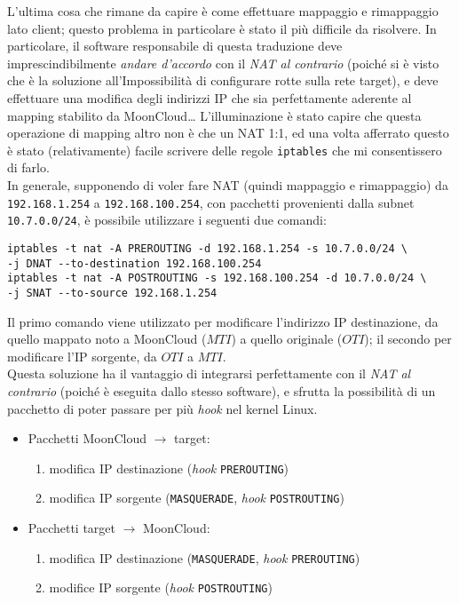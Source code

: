 L'ultima cosa che rimane da capire è come effettuare mappaggio e rimappaggio lato client;
questo problema in particolare è stato il più difficile da risolvere.
In particolare, il software responsabile di questa traduzione deve imprescindibilmente
\textit{andare d'accordo} con il \textit{NAT al contrario} (poiché si è visto che
è la soluzione all'Impossibilità di configurare rotte sulla rete target), e deve effettuare
una modifica degli indirizzi IP che sia perfettamente aderente al mapping stabilito
da MoonCloud\ldots
L'illuminazione è stato capire che questa operazione di mapping altro non è che un
NAT 1:1, ed una volta afferrato questo è stato (relativamente) facile scrivere delle
regole \texttt{iptables} che mi consentissero di farlo.\\
In generale, supponendo di voler fare NAT (quindi mappaggio e rimappaggio) da
\texttt{192.168.1.254} a \texttt{192.168.100.254},
con pacchetti provenienti dalla subnet \texttt{10.7.0.0/24}, è possibile
utilizzare i seguenti
due comandi:
\begin{verbatim}
iptables -t nat -A PREROUTING -d 192.168.1.254 -s 10.7.0.0/24 \
-j DNAT --to-destination 192.168.100.254
iptables -t nat -A POSTROUTING -s 192.168.100.254 -d 10.7.0.0/24 \
-j SNAT --to-source 192.168.1.254
\end{verbatim}
Il primo comando viene utilizzato per modificare l'indirizzo IP destinazione,
da quello mappato noto a MoonCloud ($MTI$) a quello originale ($OTI$); il secondo
per modificare l'IP sorgente, da $OTI$ a $MTI$.\\
Questa soluzione ha il vantaggio di integrarsi perfettamente con il \textit{NAT
al contrario} (poiché è eseguita dallo stesso software), e sfrutta la
possibilità di un pacchetto di poter passare per più \textit{hook}
nel kernel Linux.
\begin{itemize}
  \item Pacchetti MoonCloud $\rightarrow$ target:
  \begin{enumerate}
    \item modifica IP destinazione (\textit{hook} \texttt{PREROUTING})
    \item modifica IP sorgente (\texttt{MASQUERADE}, \textit{hook}
    \texttt{POSTROUTING})
  \end{enumerate}
  \item Pacchetti target $\rightarrow$ MoonCloud:
  \begin{enumerate}
    \item modifica IP destinazione (\texttt{MASQUERADE}, \textit{hook}
    \texttt{PREROUTING})
    \item modifice IP sorgente (\textit{hook} \texttt{POSTROUTING})
  \end{enumerate}
\end{itemize}
